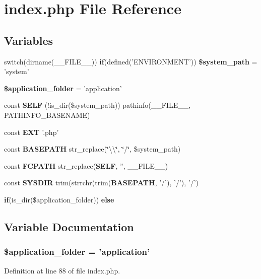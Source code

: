 \section{index.\-php File Reference}
\label{index_8php}
\subsection*{Variables}
\begin{DoxyCompactItemize}
\item 
switch(dirname(\-\_\-\-\_\-\-F\-I\-L\-E\-\_\-\-\_\-)) {\bf if}(defined('E\-N\-V\-I\-R\-O\-N\-M\-E\-N\-T')) {\bf \$system\-\_\-path} = 'system'
\item 
{\bf \$application\-\_\-folder} = 'application'
\item 
const {\bf S\-E\-L\-F} (!is\-\_\-dir(\$system\-\_\-path)) pathinfo(\-\_\-\-\_\-\-F\-I\-L\-E\-\_\-\-\_\-, P\-A\-T\-H\-I\-N\-F\-O\-\_\-\-B\-A\-S\-E\-N\-A\-M\-E)
\item 
const {\bf E\-X\-T} '.php'
\item 
const {\bf B\-A\-S\-E\-P\-A\-T\-H} str\-\_\-replace(\char`\"{}\textbackslash{}\textbackslash{}\char`\"{}, \char`\"{}/\char`\"{}, \$system\-\_\-path)
\item 
const {\bf F\-C\-P\-A\-T\-H} str\-\_\-replace({\bf S\-E\-L\-F}, '', \-\_\-\-\_\-\-F\-I\-L\-E\-\_\-\-\_\-)
\item 
const {\bf S\-Y\-S\-D\-I\-R} trim(strrchr(trim({\bf B\-A\-S\-E\-P\-A\-T\-H}, '/'), '/'), '/')
\item 
{\bf if}(is\-\_\-dir(\$application\-\_\-folder)) {\bf else}
\end{DoxyCompactItemize}


\subsection{Variable Documentation}
\subsubsection[{\$application\-\_\-folder}]{\setlength{\rightskip}{0pt plus 5cm}\$application\-\_\-folder = 'application'}\label{index_8php_ace4309eda0b92e3260b226079bc17909}


Definition at line 88 of file index.\-php.

